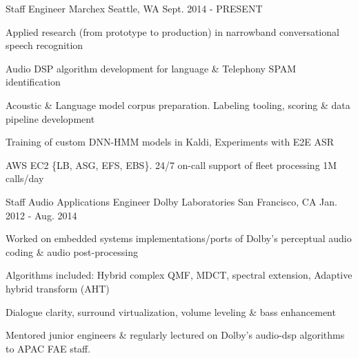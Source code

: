 

\begin{cventries}

  \cventry
    {Staff Engineer} %
    {Marchex} %
    {Seattle, WA} %
    {Sept. 2014 - PRESENT} %
    {
      \begin{cvitems} %
        \item {Applied research (from prototype to production) in narrowband conversational speech recognition}
        \item {Audio DSP algorithm development for language \& Telephony SPAM identification}
        \item {Acoustic \& Language model corpus preparation. Labeling tooling, scoring \& data pipeline development}
        \item {Training of custom DNN-HMM models in Kaldi, Experiments with E2E ASR}
        \item {AWS EC2 \{LB, ASG, EFS, EBS\}. 24/7 on-call support of fleet processing 1M calls/day}
      \end{cvitems}
    }

  \cventry
    {Staff Audio Applications Engineer} %
    {Dolby Laboratories} %
    {San Francisco, CA} %
    {Jan. 2012 - Aug. 2014} %
    {
      \begin{cvitems} %
        \item {Worked on embedded systems implementations/ports of Dolby's perceptual audio coding \& audio post-processing}
        \item {Algorithms included: Hybrid complex QMF, MDCT, spectral extension, Adaptive hybrid transform (AHT)}
        \item {Dialogue clarity, surround virtualization, volume leveling \& bass enhancement}
        \item {Mentored junior engineers \& regularly lectured on Dolby's audio-dsp algorithms to APAC FAE staff.}
      \end{cvitems}
    }


\end{cventries}
